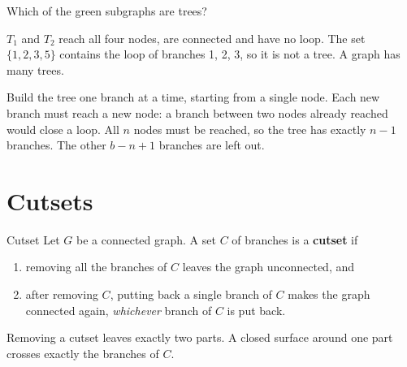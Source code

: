 \documentclass[11pt,a4paper]{article}
\newcommand{\gbranch}[4]{%
  \draw[gbr] (#1) -- (#2);
  \node[blab] at ($(#1)!0.5!(#2)!0.28cm!#3:(#2)$) {#4};}
\newcommand{\bridgecoords}{%
  \coordinate (n1) at (0,1.7);  \coordinate (n2) at (-1.5,0);
  \coordinate (n3) at (1.5,0);  \coordinate (n4) at (0,-1.7);}
\newcommand{\bridgenodes}{%
  \foreach \k/\pos in {1/above, 2/left, 3/right, 4/below}
    {\fill[metured] (n\k) circle (2.2pt); \node[nlab, \pos=3pt] at (n\k) {\k};}}
\newcommand{\bridgegraph}{%
  \gbranch{n1}{n2}{-90}{1}  \gbranch{n1}{n3}{90}{2}  \gbranch{n3}{n2}{-90}{3}
  \gbranch{n2}{n4}{-90}{4}  \gbranch{n3}{n4}{90}{5}
  \draw[gbr] (n4) to[out=180, in=180, looseness=2.3] (n1);
  \node[blab] at (-2.55,0) {6};
  \bridgenodes}
\newcommand{\sbranch}[5]{%
  \draw[#5] (#1) -- (#2);
  \node[blab] at ($(#1)!0.5!(#2)!0.28cm!#3:(#2)$) {#4};}
\newcommand{\bridgesub}[6]{%
  \sbranch{n1}{n2}{-90}{1}{#1}  \sbranch{n1}{n3}{90}{2}{#2}  \sbranch{n3}{n2}{-90}{3}{#3}
  \sbranch{n2}{n4}{-90}{4}{#4}  \sbranch{n3}{n4}{90}{5}{#5}
  \draw[#6] (n4) to[out=180, in=180, looseness=2.3] (n1);
  \node[blab] at (-2.55,0) {6};
  \bridgenodes}
\begin{document}
\begin{examplebox}
Which of the green subgraphs are trees?
\begin{center}
\end{center}
$T_1$ and $T_2$ reach all four nodes, are connected and have no loop. The set
$\{1, 2, 3, 5\}$ contains the loop of branches 1, 2, 3, so it is not a tree. A graph has many
trees.
\end{examplebox}

\begin{ideabox}
Build the tree one branch at a time, starting from a single node. Each new branch must reach
a new node: a branch between two nodes already reached would close a loop. All $n$ nodes
must be reached, so the tree has exactly $n-1$ branches. The other $b - n + 1$ branches are
left out.
\end{ideabox}

\section{Cutsets}

\begin{definitionbox}{Cutset}
Let $G$ be a connected graph. A set $C$ of branches is a \textbf{cutset} if
\begin{enumerate}
  \item removing all the branches of $C$ leaves the graph unconnected, and
  \item after removing $C$, putting back a single branch of $C$ makes the graph connected
        again, \emph{whichever} branch of $C$ is put back.
\end{enumerate}
Removing a cutset leaves exactly two parts. A closed surface around one part crosses
exactly the branches of $C$.
\end{definitionbox}
\end{document}
